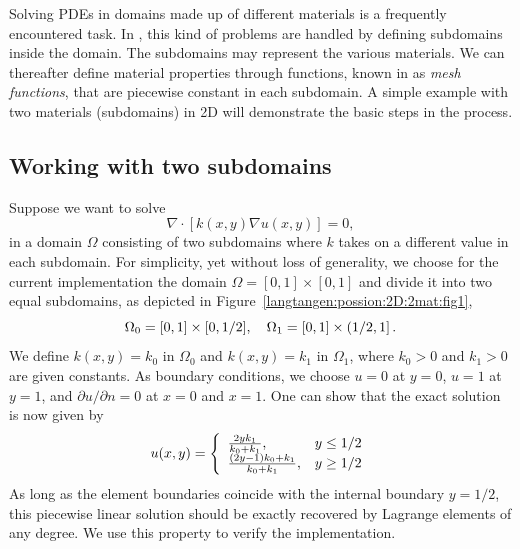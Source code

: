 Solving PDEs in domains made up of different materials is a frequently
encountered task. In \fenics, this kind of problems are handled by 
defining subdomains inside the domain. The subdomains may represent the
various materials. We can thereafter define material properties through
functions, known in \fenics{} as \emph{mesh functions}, 
that are piecewise constant in each subdomain.
A simple example with
two materials (subdomains) in 2D will
demonstrate the basic steps in the process. 

\subsection{Working with two subdomains}
\label{langtangen:possion:2D:2mat:problem}


Suppose we want to solve
\begin{equation} \label{langtangen:poisson:2D:2mat:varcoeff2}
    \nabla\cdot \left\lbrack k(x,y)\nabla u(x,y)\right\rbrack = 0,
\end{equation}
in a domain $\Omega$ consisting of two subdomains where $k$ takes on
a different value in each subdomain.
For simplicity, yet without loss of generality, we choose for the current
implementation
the domain $\Omega = [0,1]\times [0,1]$ and divide it into two equal
subdomains, as depicted in Figure~\ref{langtangen:possion:2D:2mat:fig1},
\[ \Omega_0 = [0, 1]\times [0,1/2],\quad
\Omega_1 = [0, 1]\times (1/2,1]\thinspace .\]
We define $k(x,y)=k_0$ in $\Omega_0$ and $k(x,y)=k_1$ in $\Omega_1$,
where $k_0>0$ and $k_1>0$ are given constants.
As boundary conditions, we choose $u=0$ at $y=0$, $u=1$ at $y=1$,
and $\partial u/\partial n=0$ at $x=0$ and $x=1$.
One can show that the exact solution is now given by
\begin{equation}
u(x, y) = \left\lbrace\begin{array}{ll}
{2yk_1\over k_0+k_1}, & y \leq 1/2\\
{(2y-1)k_0 + k_1\over k_0+k_1}, & y \geq 1/2
\end{array}\right.
\end{equation}
As long as the element boundaries coincide with the internal boundary
$y=1/2$, this piecewise linear solution should be exactly recovered
by Lagrange elements of any degree. We use this property to verify
the implementation.

